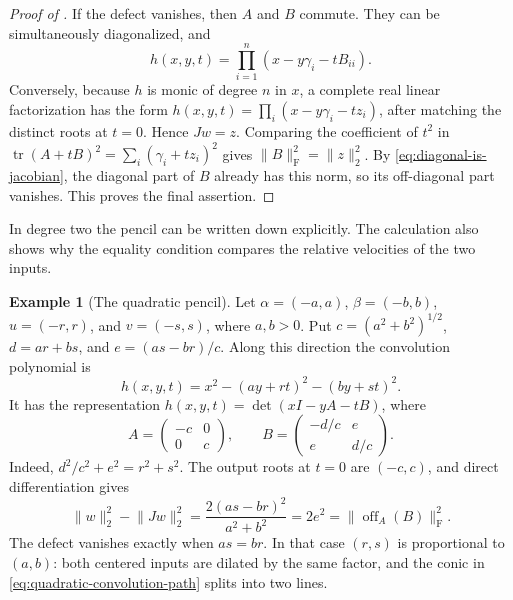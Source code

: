 \documentclass[12pt,reqno]{amsart}
\theoremstyle{definition}
\newtheorem{example}[example]{Example}
\theoremstyle{remark}
\begin{document}
\begin{proof}[Proof of ]
If the defect vanishes, then \(A\) and \(B\) commute.  They can be
simultaneously diagonalized, and
\begin{equation}\label{eq:split-pencil}
 h(x,y,t)=\prod_{i=1}^n(x-y\gamma_i-tB_{ii}).
\end{equation}
Conversely, because \(h\) is monic of degree \(n\) in \(x\), a complete
real linear factorization has the form
\(h(x,y,t)=\prod_i(x-y\gamma_i-tz_i)\), after matching the distinct roots
at \(t=0\).  Hence \(Jw=z\).  Comparing the coefficient of \(t^2\) in
\(\operatorname{tr}(A+tB)^2=\sum_i(\gamma_i+tz_i)^2\) gives
\(\lVert B\rVert_{\mathrm F}^2=\lVert z\rVert_2^2\).  By
\eqref{eq:diagonal-is-jacobian}, the diagonal part of \(B\) already has
this norm, so its off-diagonal part vanishes.  This proves the final
assertion.
\end{proof}

In degree two the pencil can be written down explicitly.  The calculation
also shows why the equality condition compares the relative velocities of
the two inputs.

\begin{example}[The quadratic pencil]\label{ex:quadratic-pencil}
Let \(\alpha=(-a,a)\), \(\beta=(-b,b)\),
\(u=(-r,r)\), and \(v=(-s,s)\), where \(a,b>0\).  Put
\(c=(a^2+b^2)^{1/2}\), \(d=ar+bs\), and \(e=(as-br)/c\).  Along this
direction the convolution polynomial is
\begin{equation}\label{eq:quadratic-convolution-path}
 h(x,y,t)=x^2-(ay+rt)^2-(by+st)^2.
\end{equation}
It has the representation \(h(x,y,t)=\det(xI-yA-tB)\), where
\begin{equation}\label{eq:quadratic-pencil-matrices}
 A=\begin{pmatrix}-c&0\\0&c\end{pmatrix},\qquad
 B=\begin{pmatrix}-d/c&e\\e&d/c\end{pmatrix}.
\end{equation}
Indeed,
\(d^2/c^2+e^2=r^2+s^2\).  The output roots at \(t=0\) are \((-c,c)\),
and direct differentiation gives
\begin{equation}\label{eq:quadratic-defect}
 \lVert w\rVert_2^2-\lVert Jw\rVert_2^2
 =\frac{2(as-br)^2}{a^2+b^2}
 =2e^2
 =\lVert\operatorname{off}_A(B)\rVert_{\mathrm F}^2.
\end{equation}
The defect vanishes exactly when \(as=br\).  In that case
\((r,s)\) is proportional to \((a,b)\): both centered inputs are dilated by
the same factor, and the conic in \eqref{eq:quadratic-convolution-path}
splits into two lines.
\end{example}
\end{document}
